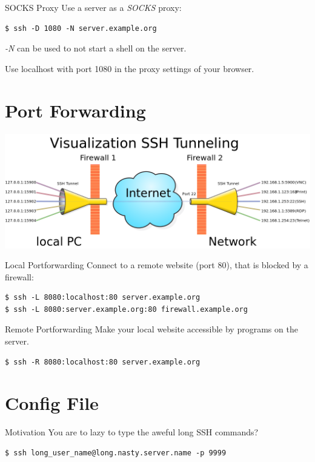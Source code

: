 \documentclass[10pt,graphics,aspectratio=169,table]{beamer}
\begin{document}
\begin{frame}[fragile]{SOCKS Proxy}
	Use a server as a \textit{SOCKS} proxy:
	\begin{lstlisting}
$ ssh -D 1080 -N server.example.org
	\end{lstlisting}
	\textit{-N} can be used to not start a shell on the server.

	Use localhost with port 1080 in the proxy settings of your browser.
\end{frame}

\section{Port Forwarding}
\begin{frame}
	\includegraphics[width=\textwidth]{img/tunnel.png} \cite{tunnel}
\end{frame}

\begin{frame}[fragile]{Local Portforwarding}
	Connect to a remote website (port 80), that is blocked by a firewall:
	\begin{lstlisting}
$ ssh -L 8080:localhost:80 server.example.org
$ ssh -L 8080:server.example.org:80 firewall.example.org
	\end{lstlisting}
\end{frame}

\begin{frame}[fragile]{Remote Portforwarding}
	Make your local website accessible by programs on the server.
	\begin{lstlisting}
$ ssh -R 8080:localhost:80 server.example.org
	\end{lstlisting}
\end{frame}

\section{Config File}
\begin{frame}[fragile]{Motivation}
	You are to lazy to type the aweful long SSH commands?
	\begin{lstlisting}
$ ssh long_user_name@long.nasty.server.name -p 9999
	\end{lstlisting}
\end{frame}
\end{document}
